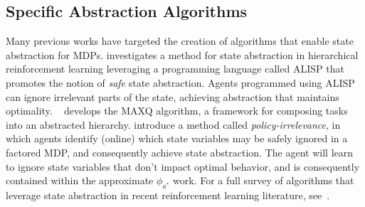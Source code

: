 \documentclass{article}
\newcommand\dnote[1]{\textcolor{blue}{Dave: #1}}
\begin{document}

\subsection{Specific Abstraction Algorithms}
Many previous works have targeted the creation of algorithms that enable state abstraction for MDPs. \citep{andre2002state} investigates a method for state abstraction in hierarchical reinforcement learning leveraging a programming language called ALISP that promotes the notion of {\it safe} state abstraction. Agents programmed using ALISP can ignore irrelevant parts of the state, achieving abstraction that maintains optimality. ~\cite{dietterich2000hierarchical} develops the MAXQ algorithm, a framework for composing tasks into an abstracted hierarchy. \citep{jong2005state} introduce a method called {\it policy-irrelevance}, in which agents identify (online) which state variables may be safely ignored in a factored MDP, and consequently achieve state abstraction. The agent will learn to ignore state variables that don't impact optimal behavior, and is consequently contained within the approximate $\phi_{a^*}$ work. For a full survey of algorithms that leverage state abstraction in recent reinforcement learning literature, see~\cite{li2006towards}.


\end{document}
